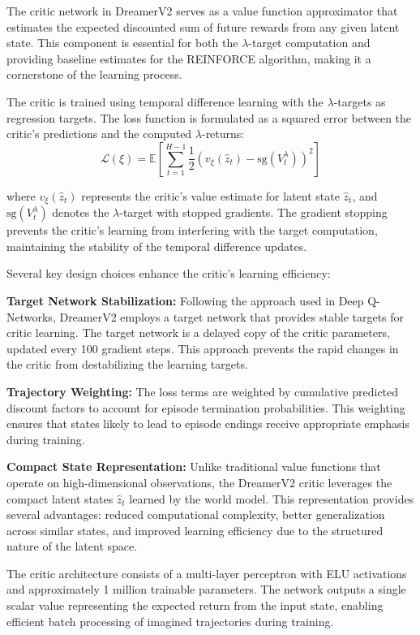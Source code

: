 \documentclass[
	english,
	ruledheaders=section,
	class=report,
	thesis={type=master},
	accentcolor=9c,
	custommargins=true,
	marginpar=false,
	parskip=half-,
	fontsize=11pt,
]{tudapub}
\begin{document}
The critic network in DreamerV2 serves as a value function approximator that estimates the expected discounted sum of future rewards from any given latent state. This component is essential for both the $\lambda$-target computation and providing baseline estimates for the REINFORCE algorithm, making it a cornerstone of the learning process.

The critic is trained using temporal difference learning with the $\lambda$-targets as regression targets. The loss function is formulated as a squared error between the critic's predictions and the computed $\lambda$-returns:
\begin{equation}
	\mathcal{L}(\xi) = \mathbb{E}\left[\sum_{t=1}^{H-1} \frac{1}{2} \left(v_\xi(\hat{z}_t) - \text{sg}(V^{\lambda}_t)\right)^2\right]
\end{equation}

where $v_\xi(\hat{z}_t)$ represents the critic's value estimate for latent state $\hat{z}_t$, and $\text{sg}(V^{\lambda}_t)$ denotes the $\lambda$-target with stopped gradients. The gradient stopping prevents the critic's learning from interfering with the target computation, maintaining the stability of the temporal difference updates.

Several key design choices enhance the critic's learning efficiency:

\textbf{Target Network Stabilization:} Following the approach used in Deep Q-Networks, DreamerV2 employs a target network that provides stable targets for critic learning. The target network is a delayed copy of the critic parameters, updated every 100 gradient steps. This approach prevents the rapid changes in the critic from destabilizing the learning targets.

\textbf{Trajectory Weighting:} The loss terms are weighted by cumulative predicted discount factors to account for episode termination probabilities. This weighting ensures that states likely to lead to episode endings receive appropriate emphasis during training.

\textbf{Compact State Representation:} Unlike traditional value functions that operate on high-dimensional observations, the DreamerV2 critic leverages the compact latent states $\hat{z}_t$ learned by the world model. This representation provides several advantages: reduced computational complexity, better generalization across similar states, and improved learning efficiency due to the structured nature of the latent space.

The critic architecture consists of a multi-layer perceptron with ELU activations and approximately 1 million trainable parameters. The network outputs a single scalar value representing the expected return from the input state, enabling efficient batch processing of imagined trajectories during training.
\end{document}
